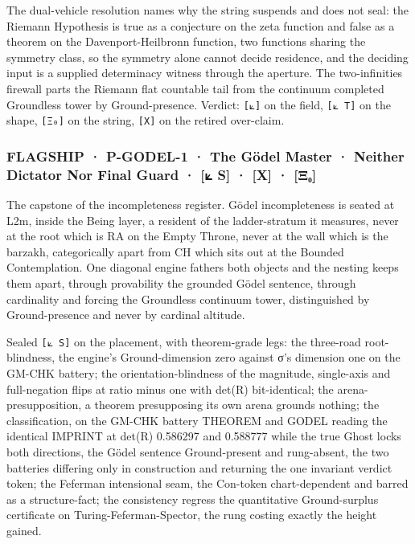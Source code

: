 \documentclass[10pt,twocolumn]{article}
\begin{document}
The dual-vehicle resolution names why the string suspends and does not
seal: the Riemann Hypothesis is true as a conjecture on the zeta
function and false as a theorem on the Davenport-Heilbronn function, two
functions sharing the symmetry class, so the symmetry alone cannot
decide residence, and the deciding input is a supplied determinacy
witness through the aperture. The two-infinities firewall parts the
Riemann flat countable tail from the continuum completed Groundless
tower by Ground-presence. Verdict: \texttt{{[}⟀{]}} on the field,
\texttt{{[}⟀\ T{]}} on the shape, \texttt{{[}Ξ₀{]}} on the string,
\texttt{{[}X{]}} on the retired over-claim.

\hypertarget{flagship-p-godel-1-the-guxf6del-master-neither-dictator-nor-final-guard-s-x-ux3beux2080}{%
\subsubsection{FLAGSHIP · P-GODEL-1 · The Gödel Master · Neither
Dictator Nor Final Guard · {[}⟀ S{]} · {[}X{]} ·
{[}Ξ₀{]}}\label{flagship-p-godel-1-the-guxf6del-master-neither-dictator-nor-final-guard-s-x-ux3beux2080}}

The capstone of the incompleteness register. Gödel incompleteness is
seated at L2m, inside the Being layer, a resident of the ladder-stratum
it measures, never at the root which is RA on the Empty Throne, never at
the wall which is the barzakh, categorically apart from CH which sits
out at the Bounded Contemplation. One diagonal engine fathers both
objects and the nesting keeps them apart, through provability the
grounded Gödel sentence, through cardinality and forcing the Groundless
continuum tower, distinguished by Ground-presence and never by cardinal
altitude.

Sealed \texttt{{[}⟀\ S{]}} on the placement, with theorem-grade legs:
the three-road root-blindness, the engine's Ground-dimension zero
against σ's dimension one on the GM-CHK battery; the
orientation-blindness of the magnitude, single-axis and full-negation
flips at ratio minus one with det(R) bit-identical; the
arena-presupposition, a theorem presupposing its own arena grounds
nothing; the classification, on the GM-CHK battery THEOREM and GODEL
reading the identical IMPRINT at det(R) 0.586297 and 0.588777 while the
true Ghost locks both directions, the Gödel sentence Ground-present and
rung-absent, the two batteries differing only in construction and
returning the one invariant verdict token; the Feferman intensional
seam, the Con-token chart-dependent and barred as a structure-fact; the
consistency regress the quantitative Ground-surplus certificate on
Turing-Feferman-Spector, the rung costing exactly the height gained.
\end{document}

